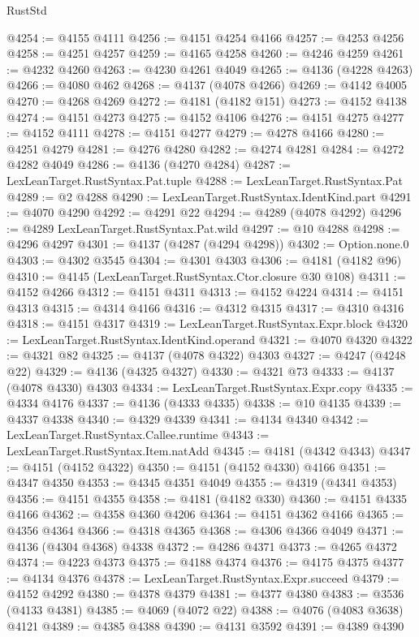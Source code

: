 \begin{lexlean}{RustStd}
\begin{coremodule}
@4254 := @4155 @4111
@4256 := @4151 @4254 @4166
@4257 := @4253 @4256
@4258 := @4251 @4257
@4259 := @4165 @4258
@4260 := @4246 @4259
@4261 := @4232 @4260
@4263 := @4230 @4261 @4049
@4265 := @4136 (@4228 @4263)
@4266 := @4080 @462
@4268 := @4137 (@4078 @4266)
@4269 := @4142 @4005
@4270 := @4268 @4269
@4272 := @4181 (@4182 @151)
@4273 := @4152 @4138
@4274 := @4151 @4273
@4275 := @4152 @4106
@4276 := @4151 @4275
@4277 := @4152 @4111
@4278 := @4151 @4277
@4279 := @4278 @4166
@4280 := @4251 @4279
@4281 := @4276 @4280
@4282 := @4274 @4281
@4284 := @4272 @4282 @4049
@4286 := @4136 (@4270 @4284)
@4287 := LexLeanTarget.RustSyntax.Pat.tuple
@4288 := LexLeanTarget.RustSyntax.Pat
@4289 := @2 @4288
@4290 := LexLeanTarget.RustSyntax.IdentKind.part
@4291 := @4070 @4290
@4292 := @4291 @22
@4294 := @4289 (@4078 @4292)
@4296 := @4289 LexLeanTarget.RustSyntax.Pat.wild
@4297 := @10 @4288
@4298 := @4296 @4297
@4301 := @4137 (@4287 (@4294 @4298))
@4302 := Option.none.{0}
@4303 := @4302 @3545
@4304 := @4301 @4303
@4306 := @4181 (@4182 @96)
@4310 := @4145 (LexLeanTarget.RustSyntax.Ctor.closure @30 @108)
@4311 := @4152 @4266
@4312 := @4151 @4311
@4313 := @4152 @4224
@4314 := @4151 @4313
@4315 := @4314 @4166
@4316 := @4312 @4315
@4317 := @4310 @4316
@4318 := @4151 @4317
@4319 := LexLeanTarget.RustSyntax.Expr.block
@4320 := LexLeanTarget.RustSyntax.IdentKind.operand
@4321 := @4070 @4320
@4322 := @4321 @82
@4325 := @4137 (@4078 @4322) @4303
@4327 := @4247 (@4248 @22)
@4329 := @4136 (@4325 @4327)
@4330 := @4321 @73
@4333 := @4137 (@4078 @4330) @4303
@4334 := LexLeanTarget.RustSyntax.Expr.copy
@4335 := @4334 @4176
@4337 := @4136 (@4333 @4335)
@4338 := @10 @4135
@4339 := @4337 @4338
@4340 := @4329 @4339
@4341 := @4134 @4340
@4342 := LexLeanTarget.RustSyntax.Callee.runtime
@4343 := LexLeanTarget.RustSyntax.Item.natAdd
@4345 := @4181 (@4342 @4343)
@4347 := @4151 (@4152 @4322)
@4350 := @4151 (@4152 @4330) @4166
@4351 := @4347 @4350
@4353 := @4345 @4351 @4049
@4355 := @4319 (@4341 @4353)
@4356 := @4151 @4355
@4358 := @4181 (@4182 @330)
@4360 := @4151 @4335 @4166
@4362 := @4358 @4360 @4206
@4364 := @4151 @4362 @4166
@4365 := @4356 @4364
@4366 := @4318 @4365
@4368 := @4306 @4366 @4049
@4371 := @4136 (@4304 @4368) @4338
@4372 := @4286 @4371
@4373 := @4265 @4372
@4374 := @4223 @4373
@4375 := @4188 @4374
@4376 := @4175 @4375
@4377 := @4134 @4376
@4378 := LexLeanTarget.RustSyntax.Expr.succeed
@4379 := @4152 @4292
@4380 := @4378 @4379
@4381 := @4377 @4380
@4383 := @3536 (@4133 @4381)
@4385 := @4069 (@4072 @22)
@4388 := @4076 (@4083 @3638) @4121
@4389 := @4385 @4388
@4390 := @4131 @3592
@4391 := @4389 @4390

\end{coremodule}
\end{lexlean}
